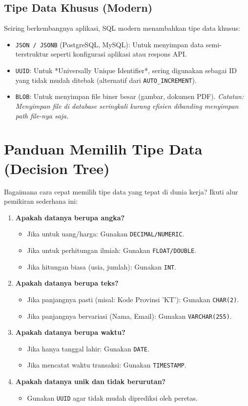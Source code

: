 \documentclass[11pt,a4paper]{article}
\begin{document}
\subsection{Tipe Data Khusus (Modern)}
Seiring berkembangnya aplikasi, SQL modern menambahkan tipe data khusus:
\begin{itemize}
	\item \texttt{JSON / JSONB} (PostgreSQL, MySQL): Untuk menyimpan data semi-terstruktur seperti konfigurasi aplikasi atau respons API.
	\item \texttt{UUID}: Untuk *Universally Unique Identifier*, sering digunakan sebagai ID yang tidak mudah ditebak (alternatif dari \texttt{AUTO\_INCREMENT}).
	\item \texttt{BLOB}: Untuk menyimpan file biner besar (gambar, dokumen PDF). \textit{Catatan: Menyimpan file di database seringkali kurang efisien dibanding menyimpan path file-nya saja.}
\end{itemize}

\section{Panduan Memilih Tipe Data (Decision Tree)}

Bagaimana cara cepat memilih tipe data yang tepat di dunia kerja? Ikuti alur pemikiran sederhana ini:

\begin{enumerate}
	\item \textbf{Apakah datanya berupa angka?}
	      \begin{itemize}
		      \item Jika untuk uang/harga: Gunakan \texttt{DECIMAL/NUMERIC}.
		      \item Jika untuk perhitungan ilmiah: Gunakan \texttt{FLOAT/DOUBLE}.
		      \item Jika hitungan biasa (usia, jumlah): Gunakan \texttt{INT}.
	      \end{itemize}
	\item \textbf{Apakah datanya berupa teks?}
	      \begin{itemize}
		      \item Jika panjangnya pasti (misal: Kode Provinsi 'KT'): Gunakan \texttt{CHAR(2)}.
		      \item Jika panjangnya bervariasi (Nama, Email): Gunakan \texttt{VARCHAR(255)}.
	      \end{itemize}
	\item \textbf{Apakah datanya berupa waktu?}
	      \begin{itemize}
		      \item Jika hanya tanggal lahir: Gunakan \texttt{DATE}.
		      \item Jika mencatat waktu transaksi: Gunakan \texttt{TIMESTAMP}.
	      \end{itemize}
	\item \textbf{Apakah datanya unik dan tidak berurutan?}
	      \begin{itemize}
		      \item Gunakan \texttt{UUID} agar tidak mudah diprediksi oleh peretas.
	      \end{itemize}
\end{enumerate}
\end{document}
